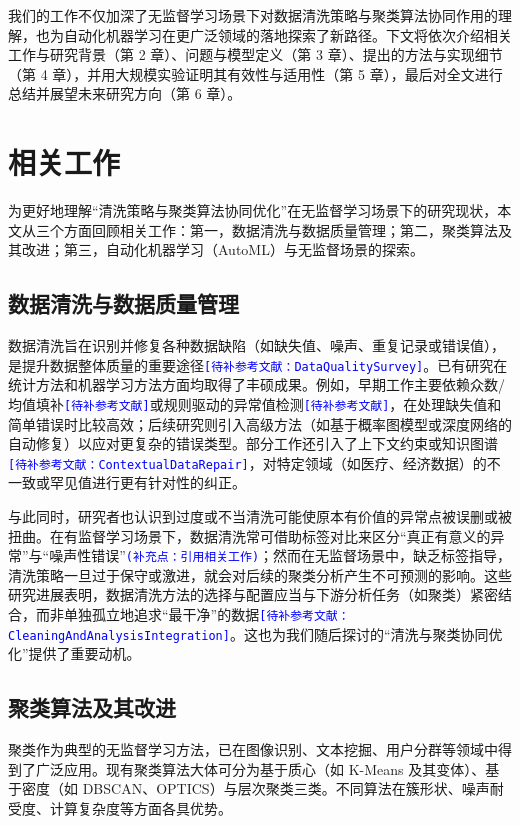 \documentclass[10pt]{article} %
\numberwithin{equation}{section}
\begin{document}
我们的工作不仅加深了无监督学习场景下对数据清洗策略与聚类算法协同作用的理解，也为自动化机器学习在更广泛领域的落地探索了新路径。下文将依次介绍相关工作与研究背景（第 2 章）、问题与模型定义（第 3 章）、提出的方法与实现细节（第 4 章），并用大规模实验证明其有效性与适用性（第 5 章），最后对全文进行总结并展望未来研究方向（第 6 章）。



\section{相关工作}

为更好地理解“清洗策略与聚类算法协同优化”在无监督学习场景下的研究现状，本文从三个方面回顾相关工作：第一，数据清洗与数据质量管理；第二，聚类算法及其改进；第三，自动化机器学习（AutoML）与无监督场景的探索。

\subsection{数据清洗与数据质量管理}
数据清洗旨在识别并修复各种数据缺陷（如缺失值、噪声、重复记录或错误值），是提升数据整体质量的重要途径\textcolor{blue}{\texttt{[待补参考文献：DataQualitySurvey]}}。已有研究在统计方法和机器学习方法方面均取得了丰硕成果。例如，早期工作主要依赖众数/均值填补\textcolor{blue}{\texttt{[待补参考文献]}}或规则驱动的异常值检测\textcolor{blue}{\texttt{[待补参考文献]}}，在处理缺失值和简单错误时比较高效；后续研究则引入高级方法（如基于概率图模型或深度网络的自动修复\cite{Rekatsinas2017, 10.1145/2723372.2749431}）以应对更复杂的错误类型。部分工作还引入了上下文约束或知识图谱\textcolor{blue}{\texttt{[待补参考文献：ContextualDataRepair]}}，对特定领域（如医疗、经济数据）的不一致或罕见值进行更有针对性的纠正。

与此同时，研究者也认识到过度或不当清洗可能使原本有价值的异常点被误删或被扭曲\cite{Ni2023}。在有监督学习场景下，数据清洗常可借助标签对比来区分“真正有意义的异常”与“噪声性错误”\textcolor{blue}{\texttt{(补充点：引用相关工作)}}；然而在无监督场景中，缺乏标签指导，清洗策略一旦过于保守或激进，就会对后续的聚类分析产生不可预测的影响\cite{app112311202}。这些研究进展表明，数据清洗方法的选择与配置应当与下游分析任务（如聚类）紧密结合，而非单独孤立地追求“最干净”的数据\textcolor{blue}{\texttt{[待补参考文献：CleaningAndAnalysisIntegration]}}。这也为我们随后探讨的“清洗与聚类协同优化”提供了重要动机。

\subsection{聚类算法及其改进}
聚类作为典型的无监督学习方法，已在图像识别、文本挖掘、用户分群等领域中得到了广泛应用。现有聚类算法大体可分为基于质心（如 K-Means 及其变体\cite{Bandyapadhyay2024, Zhang2025, IKOTUN2023178}）、基于密度（如 DBSCAN、OPTICS\cite{Abdulhameed2024, Guo2024}）与层次聚类\cite{HORNG2011306}三类。不同算法在簇形状、噪声耐受度、计算复杂度等方面各具优势\cite{SINGH2024102799}。
\end{document}
